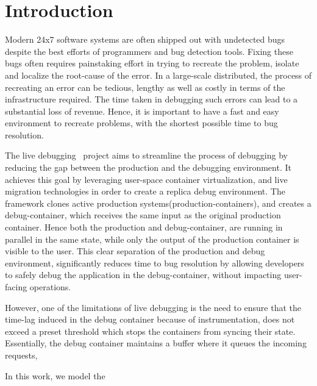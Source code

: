\section{Introduction}
\label{sec:intro}

Modern 24x7 software systems are often shipped out with undetected bugs despite the best efforts of programmers and bug detection tools. 
Fixing these bugs often requires painstaking effort in trying to recreate the problem, isolate and localize the root-cause of the error.
In a large-scale distributed, the process of recreating an error can be tedious, lengthy as well as costly in terms of the infrastructure required.
The time taken in debugging such errors can lead to a substantial loss of revenue.
Hence, it is important to have a fast and easy environment to recreate problems, with the shortest possible time to bug resolution.

The live debugging~\cite{parikshan} project aims to streamline the process of debugging by reducing the gap between the production and the debugging environment. 
It achieves this goal by leveraging user-space container virtualization, and live migration technologies in order to create a replica debug environment. 
The framework clones active production systems(production-containers), and creates a debug-container, which receives the same input as the original production container.
Hence both the production and debug-container, are running in parallel in the same state, while only the output of the production container is visible to the user.
This clear separation of the production and debug environment, significantly reduces time to bug resolution by allowing developers to safely debug the application in the debug-container, without impacting user-facing operations.

However, one of the limitations of live debugging is the need to ensure that the time-lag induced in the debug container because of instrumentation,  does not exceed a preset threshold which stops the containers from syncing their state.
Essentially, the debug container maintains a buffer where it queues the incoming requests, 

In this work, we model the 
